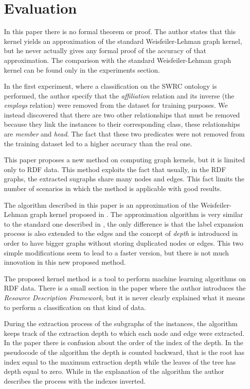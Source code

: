 \documentclass[12pt]{scrartcl}
\begin{document}
\section{Evaluation}

In this paper there is no formal theorem or proof. The author states that this kernel yields an approximation of the standard Weisfeiler-Lehman graph kernel, but he never actually gives any formal proof of the accuracy of that approximation. The comparison with the standard Weisfeiler-Lehman graph kernel can be found only in the experiments section.

In the first experiment, where a classification on the SWRC ontology \cite{swrc} is performed, the author specify that the \textit{affiliation} relation and its inverse (the \textit{employs} relation) were removed from the dataset for training purposes. We instead discovered that there are two other relationships that must be removed because they link the instances to their corresponding class, these relationships are \textit{member} and \textit{head}. The fact that these two predicates were not removed from the training dataset led to a higher accuracy than the real one.

This paper proposes a new method on computing graph kernels, but it is limited only to RDF data. This method exploits the fact that usually, in the RDF graphs, the extracted sugraphs share many nodes and edges. This fact limits the number of scenarios in which the method is applicable with good results.

The algorithm described in this paper is an approximation of the Weisfeiler-Lehman graph kernel proposed in \cite{wl-kernels}. The approximation algorithm is very similar to the standard one described in \cite{wl-kernels}, the only difference is that the label expansion process is also extended to the edges and the concept of \textit{depth} is introduced in order to have bigger graphs without storing duplicated nodes or edges. This two simple modifications seem to lead to a faster version, but there is not much innovation in this new proposed method.

The proposed kernel method is a tool to perform machine learning algorithms on RDF data. There is a small section in the paper where the author introduces the \textit{Resource Description Framework}, but it is never clearly explained what it means to perform a classification on that kind of data.

During the extraction process of the subgraphs of the instances, the algorithm keeps track of the extraction depth to which each node and edge were extracted. In the paper there is confusion about the order of the index of the depth. In the pseudocode of the algorithm the depth is counted backward, that is the root has index equal to the maximum extraction depth while the leaves of the tree has depth equal to zero. While in the explanation of the algorithm the author describes the process with the indexes inverted.
\end{document}
